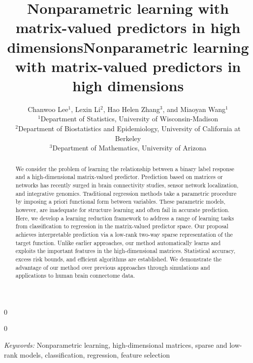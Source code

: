 \documentclass[11pt]{article}
\newcommand{\blind}{0}
\theoremstyle{definition}
\begin{document}
\blind
{   \date{}
  \title{\vspace*{-2cm}\bf Nonparametric learning with matrix-valued predictors in high dimensions}
\author{\vspace*{-.3cm} Chanwoo Lee$^{1}$, Lexin Li$^2$, Hao Helen Zhang$^3$, and Miaoyan Wang$^1$\\\vspace*{-.2cm}
$^1$Department of Statistics, University of Wisconsin-Madison\\
$^2$Department of Biostatistics and Epidemiology, University of California at Berkeley\\
$^3$Department of Mathematics, University of Arizona\\
}

    \maketitle
} \fi

\blind
{
 \date{}
  \title{\vspace*{-2cm}\bf Nonparametric learning with matrix-valued predictors in high dimensions}
\author{}
\maketitle
} \fi

\vspace{-2cm}
\begin{abstract}
We consider the problem of learning the relationship between a binary label response and a high-dimensional matrix-valued predictor. Prediction based on matrices or networks has recently surged in brain connectivity studies, sensor network localization, and integrative genomics. Traditional regression methods take a parametric procedure by imposing a priori functional form between variables. These parametric models, however, are inadequate for structure learning and often fail in accurate prediction. Here, we develop a learning reduction framework to address a range of learning tasks from classification to regression in the matrix-valued predictor space. Our proposal achieves interpretable prediction via a low-rank two-way sparse representation of the target function. Unlike earlier approaches, our method automatically learns and exploits the important features in the high-dimensional matrices. Statistical accuracy, excess risk bounds, and efficient algorithms are established. We demonstrate the advantage of our method over previous approaches through simulations and applications to human brain connectome data. 

\end{abstract}
\vspace{-.2cm}
\noindent%
{\it Keywords:}  Nonparametric learning, high-dimensional matrices, sparse and low-rank models, classification, regression, feature selection
\end{document}
